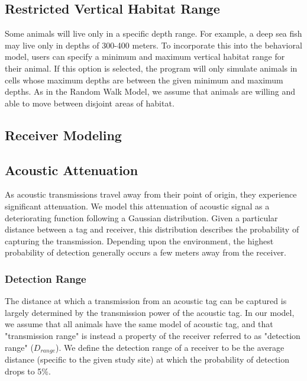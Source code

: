 \subsection{Restricted Vertical Habitat Range}
\label{restrictedVerticalHabitat}
Some animals will live only in a specific depth range.  For example, a deep sea fish may live only in depths of 300-400 meters.  To incorporate this into the behavioral model, users can specify a minimum and maximum vertical habitat range for their animal.  If this option is selected, the program will only simulate animals in cells whose maximum depths are between the given minimum and maximum depths.  As in the Random Walk Model, we assume that animals are willing and able to move between disjoint areas of habitat.


\subsection{Receiver Modeling}
\label{receiverModel}

\subsection{Acoustic Attenuation}
\label{acousticAttenuation}
As acoustic transmissions travel away from their point of origin, they experience significant attenuation.  We model this attenuation of acoustic signal as a deteriorating function following a Gaussian distribution.  Given a particular distance between a tag and receiver, this distribution describes the probability of capturing the transmission.  Depending upon the environment, the highest probability of detection generally occurs a few meters away from the receiver.

\subsubsection{Detection Range}
\label{detectionRange}
The distance at which a transmission from an acoustic tag can be captured is largely determined by the transmission power of the acoustic tag.  In our model, we assume that all animals have the same model of acoustic tag, and that "transmission range" is instead a property of the receiver referred to as "detection range" ($D_{range}$).  We define the detection range of a receiver to be the average distance (specific to the given study site) at which the probability of detection drops to 5\%.

